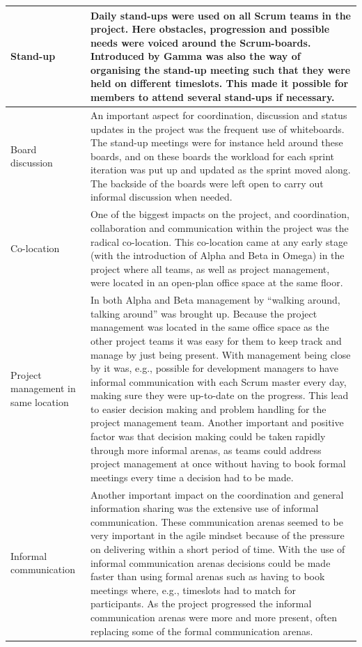 \begin{center}
\begin{longtable}{| p{6cm} | p{9cm} |}
    Stand-up & Daily stand-ups were used on all Scrum teams in the project. Here obstacles, progression and possible needs were voiced around the Scrum-boards. Introduced by Gamma was also the way of organising the stand-up meeting such that they were held on different timeslots. This made it possible for members to attend several stand-ups if necessary. \\ \hline
    Board discussion & An important aspect for coordination, discussion and status updates in the project was the frequent use of whiteboards. The stand-up meetings were for instance held around these boards, and on these boards the workload for each sprint iteration was put up and updated as the sprint moved along. The backside of the boards were left open to carry out informal discussion when needed. \\ \hline
    Co-location & One of the biggest impacts on the project, and coordination, collaboration and communication within the project was the radical co-location. This co-location came at any early stage (with the introduction of Alpha and Beta in Omega) in the project where all teams, as well as project management, were located in an open-plan office space at the same floor. \\ \hline
    Project management in same location & In both Alpha and Beta management by ``walking around, talking around'' was brought up. Because the project management was located in the same office space as the other project teams it was easy for them to keep track and manage by just being present. With management being close by it was, e.g., possible for development managers to have informal communication with each Scrum master every day, making sure they were up-to-date on the progress. This lead to easier decision making and problem handling for the project management team. Another important and positive factor was that decision making could be taken rapidly through more informal arenas, as teams could address project management at once without having to book formal meetings every time a decision had to be made. \\ \hline
    Informal communication & Another important impact on the coordination and general information sharing was the extensive use of informal communication. These communication arenas seemed to be very important in the agile mindset because of the pressure on delivering within a short period of time. With the use of informal communication arenas decisions could be made faster than using formal arenas such as having to book meetings where, e.g., timeslots had to match for participants. As the project progressed the informal communication arenas were more and more present, often replacing some of the formal communication arenas. \\ \hline

\end{longtable}
\end{center}
